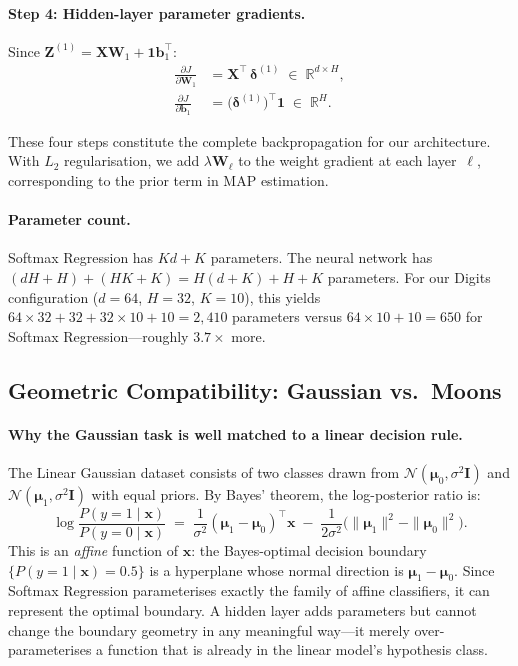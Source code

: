 \documentclass[11pt]{article}
\newcommand{\R}{\mathbb{R}}
\newcommand{\bx}{\mathbf{x}}
\newcommand{\bX}{\mathbf{X}}
\newcommand{\bW}{\mathbf{W}}
\newcommand{\bb}{\mathbf{b}}
\newcommand{\bZ}{\mathbf{Z}}
\newcommand{\bone}{\mathbf{1}}
\newcommand{\bmu}{\boldsymbol{\mu}}
\newcommand{\bdelta}{\boldsymbol{\delta}}
\begin{document}
\paragraph{Step 4: Hidden-layer parameter gradients.}
Since $\bZ^{(1)} = \bX\bW_1 + \bone\bb_1^\top$:
\begin{align}
  \frac{\partial J}{\partial \bW_1}
  &= \bX^\top\,\bdelta^{(1)}
  \;\in\;\R^{d\times H},
  \label{eq:gW1}\\[4pt]
  \frac{\partial J}{\partial \bb_1}
  &= \bigl(\bdelta^{(1)}\bigr)^\top\bone
  \;\in\;\R^{H}.
  \label{eq:gb1}
\end{align}

These four steps constitute the complete backpropagation for our architecture.
With $L_2$ regularisation, we add $\lambda\bW_\ell$ to the weight gradient at each
layer~$\ell$, corresponding to the prior term in MAP estimation.

\paragraph{Parameter count.}  Softmax Regression has $Kd + K$ parameters.
The neural network has $(dH + H) + (HK + K) = H(d+K) + H + K$ parameters.
For our Digits configuration ($d{=}64$, $H{=}32$, $K{=}10$), this yields
$64\times 32 + 32 + 32\times 10 + 10 = 2{,}410$ parameters versus $64\times 10 + 10 = 650$
for Softmax Regression---roughly $3.7{\times}$ more.

\subsection{Geometric Compatibility: Gaussian vs.\ Moons}
\label{sec:geometry}

\paragraph{Why the Gaussian task is well matched to a linear decision rule.}
The Linear Gaussian dataset consists of two classes drawn from $\mathcal{N}(\bmu_0,\sigma^2\mathbf{I})$
and $\mathcal{N}(\bmu_1,\sigma^2\mathbf{I})$ with equal priors.  By Bayes' theorem, the
log-posterior ratio is:
\begin{equation}\label{eq:logodds}
  \log\frac{P(y{=}1\mid\bx)}{P(y{=}0\mid\bx)}
  \;=\;
  \frac{1}{\sigma^2}(\bmu_1-\bmu_0)^\top\bx
  \;-\;\frac{1}{2\sigma^2}\bigl(\|\bmu_1\|^2-\|\bmu_0\|^2\bigr).
\end{equation}
This is an \emph{affine} function of $\bx$: the Bayes-optimal decision boundary
$\{P(y{=}1\mid\bx)=0.5\}$ is a hyperplane whose normal direction is $\bmu_1-\bmu_0$.
Since Softmax Regression parameterises exactly the family of affine classifiers, it can
represent the optimal boundary.  A hidden layer adds parameters but cannot change the
boundary geometry in any meaningful way---it merely over-parameterises a function that is
already in the linear model's hypothesis class.
\end{document}
